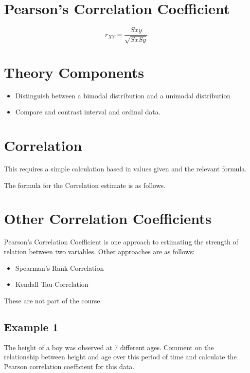 \documentclass[]{report}
\begin{document}

\section{Pearson's Correlation Coefficient}
\[ r_{XY} = \frac{Sxy}{\sqrt{SxSy}} \]








\section*{Theory Components}
\begin{itemize}
	\item Distinguish between a bimodal distribution and a unimodal distribution
	\item Compare and contrast interval and ordinal data.
\end{itemize}

\section{Correlation}

This requires a simple calculation based in values given and the relevant formula.

The formula for the Correlation estimate is as follows.







\section{Other Correlation Coefficients}
Pearson's Correlation Coefficient is one approach to estimating the strength of relation between two variables.
Other approaches are as follows:
\begin{itemize}
	\item Spearman's Rank Correlation
	\item Kendall Tau Correlation
\end{itemize}
These are not part of the course.


\subsection{Example 1}
The height of a boy was observed at 7 different ages.
Comment on the relationship between height and age over this
period of time and calculate the Pearson correlation coefficient for
this data.
\end{document}
